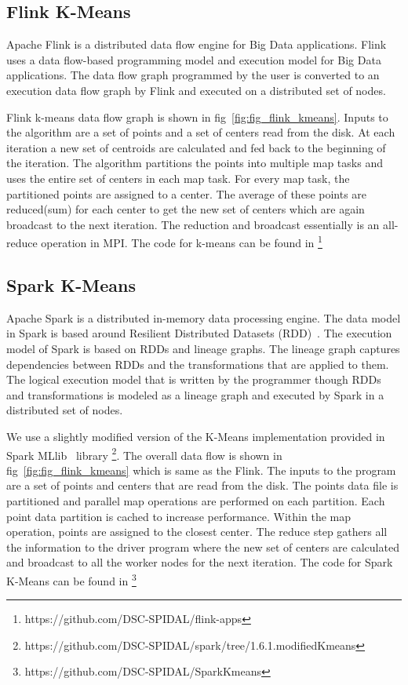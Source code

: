 \documentclass[10pt, conference, compsocconf]{IEEEtran}
\begin{document}
\subsection{Flink K-Means}
Apache Flink is a distributed data flow engine for Big Data applications. Flink uses a data flow-based programming model and execution model for Big Data applications. The data flow graph programmed by the user is converted to an execution data flow graph by Flink and executed on a distributed set of nodes.

Flink k-means data flow graph is shown in fig~\ref{fig:fig_flink_kmeans}. Inputs to the algorithm are a set of points and a set of centers read from the disk. At each iteration a new set of centroids are calculated and fed back to the beginning of the iteration. The algorithm partitions the points into multiple map tasks and uses the entire set of centers in each map task. For every map task, the partitioned points are assigned to a center. The average of these points are reduced(sum) for each center to get the new set of centers which are again broadcast to the next iteration. The reduction and broadcast essentially is an all-reduce operation in MPI. The code for k-means can be found in \footnote{https://github.com/DSC-SPIDAL/flink-apps}

\subsection{Spark K-Means}
Apache Spark is a distributed in-memory data processing engine. The data model in Spark is based around Resilient Distributed Datasets (RDD)~\cite{zaharia2012resilient}. The execution model of Spark is based on RDDs and lineage graphs. The lineage graph captures dependencies between RDDs and the transformations that are applied to them. The logical execution model that is written by the programmer though RDDs and transformations is modeled as a lineage graph and executed by Spark in a distributed set of nodes.

We use a slightly modified version of the K-Means implementation provided in Spark MLlib~\cite{meng2016mllib} library \footnote{https://github.com/DSC-SPIDAL/spark/tree/1.6.1.modifiedKmeans}. The overall data flow is shown in fig~\ref{fig:fig_flink_kmeans} which is same as the Flink. The inputs to the program are a set of points and centers that are read from the disk. The points data file is partitioned and parallel map operations are performed on each partition. Each point data partition is cached to increase performance. Within the map operation, points are assigned to the closest center. The reduce step gathers all the information to the driver program where the new set of centers are calculated and broadcast to all the worker nodes for the next iteration. The code for Spark K-Means can be found in \footnote{https://github.com/DSC-SPIDAL/SparkKmeans}
\end{document}
